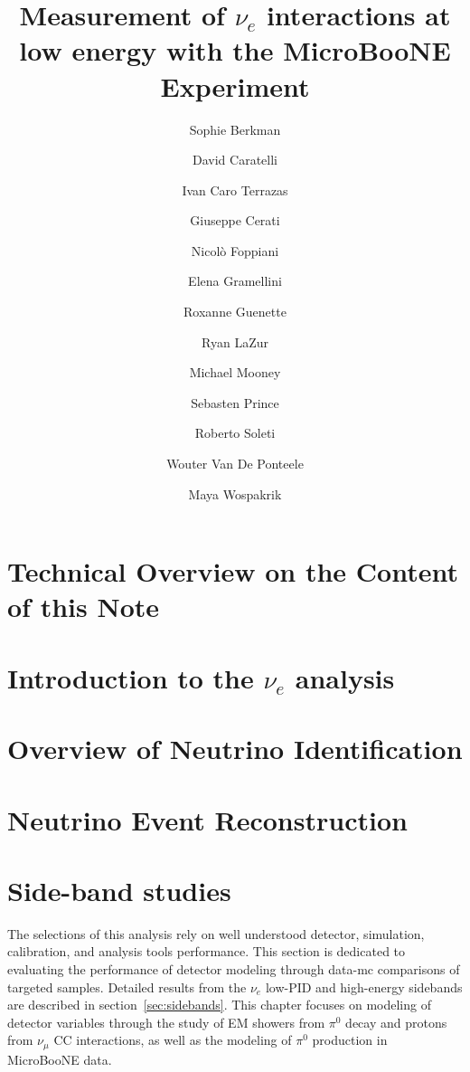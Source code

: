 \documentclass[a4paper]{article}
\title{Measurement of $\nu_e$ interactions at low energy with the MicroBooNE Experiment}
\author[1]{Sophie Berkman}
\author[1]{David Caratelli}
\author[2]{Ivan Caro Terrazas}
\author[1]{Giuseppe Cerati}
\author[3]{Nicol\`o Foppiani}
\author[1]{Elena Gramellini}
\author[3]{Roxanne Guenette}
\author[2]{Ryan LaZur}
\author[2]{Michael Mooney}
\author[3]{Sebasten Prince}
\author[3,4]{Roberto Soleti}
\author[3,4]{Wouter Van De Ponteele}
\author[1]{Maya Wospakrik}
\affil[1]{Fermi National Accelerator Laboratory}
\affil[2]{Colorado State University}
\affil[3]{Harvard University}
\affil[4]{University of Oxford}
\begin{document}
\maketitle


\tableofcontents

\newpage
\section{Technical Overview on the Content of this Note}

\newpage

\section{Introduction to the $\nu_e$ analysis}

\newpage

\section{Overview of Neutrino Identification}
\label{sec:sliceID}

\newpage

\section{Neutrino Event Reconstruction}
\label{sec:NuEvtReco}

\newpage

\section{Side-band studies}
\label{sec:controls}

\par The selections of this analysis rely on well understood detector, simulation, calibration, and analysis tools performance. This section is dedicated to evaluating the performance of detector modeling through data-mc comparisons of targeted samples. Detailed results from the $\nu_e$ low-PID and high-energy sidebands are described in section~\ref{sec:sidebands}. This chapter focuses on modeling of detector variables through the study of EM showers from $\pi^0$ decay and protons from $\nu_{\mu}$ CC interactions, as well as the modeling of $\pi^0$ production in MicroBooNE data.
\end{document}
